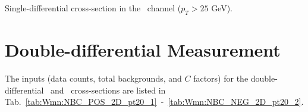 \begin{table}
\begin{center}

\caption{ Single-differential cross-section in the \Wmunum\ channel ($p_T>25$ GeV).}
\label{tab:Wmn:XS_NEG_1D_pt25}
\end{center}
\end{table}



\section{Double-differential Measurement}

The inputs (data counts, total backgrounds, and $C$ factors) for the double-differential \Wmunup\ and \Wmunum\ cross-sections are listed in Tab.~\ref{tab:Wmn:NBC_POS_2D_pt20_1}~-~\ref{tab:Wmn:NBC_NEG_2D_pt20_2}.

